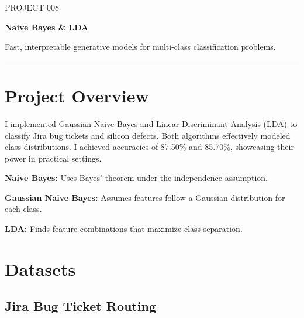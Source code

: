 \documentclass[11pt,a4paper]{article}
\begin{document}
\thispagestyle{empty}

{\colorbox{primary}{}}

\vspace{6pt}

{\fontsize{9}{11}\selectfont\color{codemuted}PROJECT 008}

\vspace{1pt}
{\fontsize{22}{27}\selectfont\bfseries\color{titleblue} Naive Bayes \& LDA}

\vspace{2pt}
{\normalsize\color{accent} Fast, interpretable generative models for multi-class classification problems.}

\vspace{4pt}
{\color{tableheader}\rule{\linewidth}{0.4pt}}

\vspace{3pt}

\section{Project Overview}

I implemented Gaussian Naive Bayes and Linear Discriminant Analysis (LDA) to classify Jira bug tickets and silicon defects. Both algorithms effectively modeled class distributions. I achieved accuracies of 87.50\% and 85.70\%, showcasing their power in practical settings.

\textbf{Naive Bayes:} Uses Bayes' theorem under the independence assumption.

\textbf{Gaussian Naive Bayes:} Assumes features follow a Gaussian distribution for each class.

\textbf{LDA:} Finds feature combinations that maximize class separation.


\section{Datasets}

\subsection{Jira Bug Ticket Routing}
\end{document}
